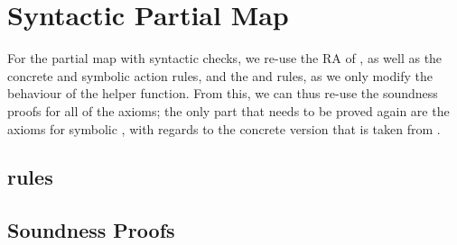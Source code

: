 \section{Syntactic Partial Map}

For the partial map with syntactic checks, we re-use the RA of \PMap, as well as the concrete and symbolic action rules, and the \produce{} and \consume{} rules, as we only modify the behaviour of the  helper function. From this, we can thus re-use the soundness proofs for all of the axioms; the only part that needs to be proved again are the axioms for symbolic , with regards to the concrete version that is taken from \PMap.

\subsection{ rules}


\subsection{Soundness Proofs}

